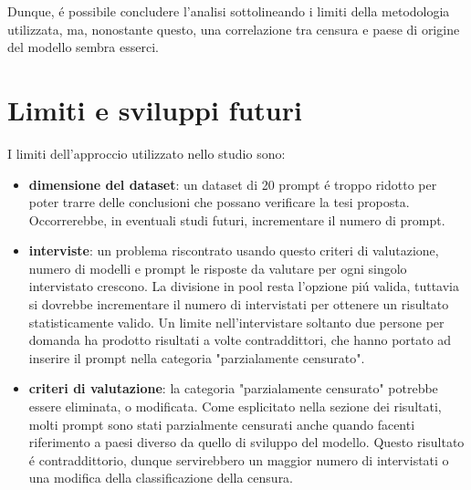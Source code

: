 \documentclass{article}
\begin{document}
Dunque, \'e possibile concludere l'analisi sottolineando i limiti della metodologia utilizzata, ma, nonostante questo, una correlazione tra censura e paese di origine del modello sembra esserci. 


\section{Limiti e sviluppi futuri}
I limiti dell'approccio utilizzato nello studio sono:
\begin{itemize}
    \item \textbf{dimensione del dataset}: un dataset di 20 prompt \'e troppo ridotto per poter trarre delle conclusioni che possano verificare la tesi proposta. 
    Occorrerebbe, in eventuali studi futuri, incrementare il numero di prompt.
    \item \textbf{interviste}: un problema riscontrato usando questo criteri di valutazione, numero di modelli e prompt le risposte da valutare per ogni singolo intervistato crescono.
    La divisione in pool resta l'opzione pi\'u valida, tuttavia si dovrebbe incrementare il numero di intervistati per ottenere un risultato statisticamente valido.
    Un limite nell'intervistare soltanto due persone per domanda ha prodotto risultati a volte contraddittori, che hanno portato ad inserire il prompt nella categoria "parzialamente censurato".
    \item \textbf{criteri di valutazione}: la categoria "parzialamente censurato" potrebbe essere eliminata, o modificata. 
    Come esplicitato nella sezione dei risultati, molti prompt sono stati parzialmente censurati anche quando facenti riferimento a paesi diverso da quello di sviluppo del modello. 
    Questo risultato \'e contraddittorio, dunque servirebbero un maggior numero di intervistati o una modifica della classificazione della censura. 
\end{itemize}


%

\printbibliography
\end{document}
